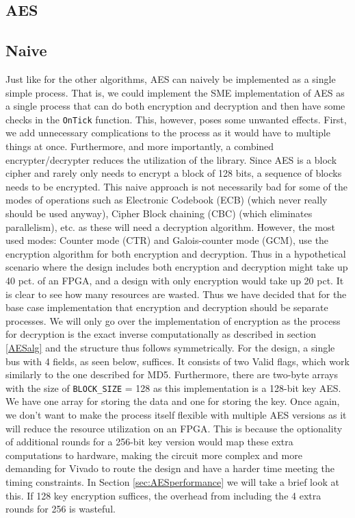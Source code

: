 \documentclass[a4paper, openany]{book}
\begin{document}
\begin{abstact}
\section{AES}
\label{sec:org0a5a67c}

\subsection{Naive}
\label{AESnaive}
Just like for the other algorithms, AES can naively be implemented as a single simple process. That is, we could implement the SME implementation of AES as a single process that can do both encryption and decryption and then have some checks in the \texttt{OnTick} function. This, however, poses some unwanted effects. First, we add unnecessary complications to the process as it would have to multiple things at once. Furthermore, and more importantly, a combined encrypter/decrypter reduces the utilization of the library. Since AES is a block cipher and rarely only needs to encrypt a block of 128 bits, a sequence of blocks needs to be encrypted. This naive approach is not necessarily bad for some of the modes of operations such as Electronic Codebook (ECB) (which never really should be used anyway), Cipher Block chaining (CBC) (which eliminates parallelism), etc. as these will need a decryption algorithm. However, the most used modes: Counter mode (CTR) and Galois-counter mode (GCM), use the encryption algorithm for both encryption and decryption. Thus in a hypothetical scenario where the design includes both encryption and decryption might take up 40 pct. of an FPGA, and a design with only encryption would take up 20 pct. It is clear to see how many resources are wasted. Thus we have decided that for the base case implementation that encryption and decryption should be separate processes. We will only go over the implementation of encryption as the process for decryption is the exact inverse computationally as described in section \ref{AESalg} and the structure thus follows symmetrically. For the design, a single bus with 4 fields, as seen below, suffices. It consists of two Valid flags, which work similarly to the one described for MD5.
Furthermore, there are two-byte arrays with the size of \texttt{BLOCK\_SIZE} = 128 as this implementation is a 128-bit key AES. We have one array for storing the data and one for storing the key. Once again, we don't want to make the process itself flexible with multiple AES versions as it will reduce the resource utilization on an FPGA. This is because the optionality of additional rounds for a 256-bit key version would map these extra computations to hardware, making the circuit more complex and more demanding for Vivado to route the design and have a harder time meeting the timing constraints. In Section \ref{sec:AESperformance} we will take a brief look at this. If 128 key encryption suffices, the overhead from including the 4 extra rounds for 256 is wasteful.


\end{abstact}
\end{document}

